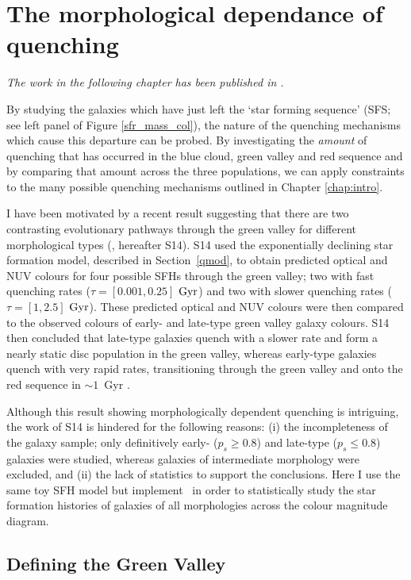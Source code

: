 \chapter{The morphological dependance of quenching}\label{chap:morph}

\emph{The work in the following chapter has been published in \citet{smethurst15}.}


By studying the galaxies which have just left the `star forming sequence' (SFS; see left panel of Figure \ref{sfr_mass_col}), the nature of the quenching mechanisms which cause this departure can be probed. By investigating the \emph{amount} of quenching that has occurred in the blue cloud, green valley and red sequence and by comparing that amount across the three populations, we can apply constraints to the many possible quenching mechanisms outlined in Chapter \ref{chap:intro}. 

I have been motivated by a recent result suggesting that there are two contrasting evolutionary pathways through the green valley for different morphological types (\citealt{schawinski14}, hereafter S14). S14 used the exponentially declining star formation model, described in Section~\ref{qmod}, to obtain predicted optical and NUV colours for four possible SFHs through the green valley; two with fast quenching rates ($\tau = [0.001, 0.25]$ $\rm{Gyr}$) and two with slower quenching rates ($\tau = [1, 2.5]$ $\rm{Gyr}$). These predicted optical and NUV colours were then compared to the observed colours of early- and late-type green valley galaxy colours. S14 then concluded that late-type galaxies quench with a slower rate and form a nearly static disc population in the green valley, whereas early-type galaxies quench with very rapid rates, transitioning through the green valley and onto the red sequence in $\sim 1$~Gyr \citep{Wong12}. 

Although this result showing morphologically dependent quenching is intriguing, the work of S14 is hindered for the following reasons: (i) the incompleteness of the galaxy sample; only definitively early- ($p_s \geq 0.8$) and late-type ($p_s \leq 0.8$) galaxies were studied, whereas galaxies of intermediate morphology were excluded, and (ii) the lack of statistics to support the conclusions. Here I use the same toy SFH model but implement \starpy ~in order to statistically study the star formation histories of galaxies of all morphologies across the colour magnitude diagram.


\section{Defining the Green Valley}\label{defGV}


